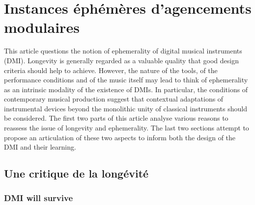 %
\chapter{Instances éphémères d'agencements modulaires}
\label{ch:ephemeral}



This article questions the notion of ephemerality of digital musical instruments (DMI). Longevity is generally regarded as a valuable quality that good design criteria should help to achieve. However, the nature of the tools, of the performance conditions and of the music itself may lead to think of ephemerality as an intrinsic modality of the existence of DMIs. In particular, the conditions of contemporary musical production suggest that contextual adaptations of instrumental devices beyond the monolithic unity of classical instruments should be considered. The first two parts of this article analyse various reasons to reassess the issue of longevity and ephemerality. The last two sections attempt to propose an articulation of these two aspects to inform both the design of the DMI and their learning.

\section{Une critique de la longévité}
\label{sec:ephemerality:critique}

\subsection{DMI will survive}


